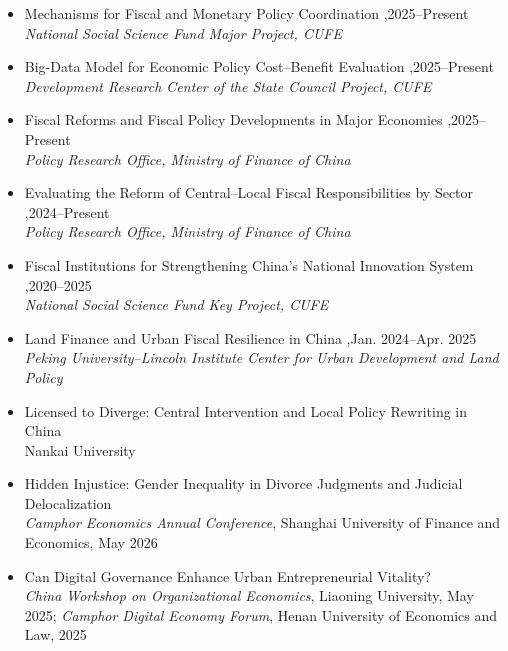 \documentclass[a4paper,10pt]{article}
\begin{document}
\begin{itemize}[itemsep=0.35em, topsep=0.5em]

\item Mechanisms for Fiscal and Monetary Policy Coordination \sep 2025--Present\\
  {\color{gray}\textit{National Social Science Fund Major Project, CUFE}}

\item Big-Data Model for Economic Policy Cost--Benefit Evaluation \sep 2025--Present\\
  {\color{gray}\textit{Development Research Center of the State Council Project, CUFE}}

\item Fiscal Reforms and Fiscal Policy Developments in Major Economies \sep 2025--Present\\
  {\color{gray}\textit{Policy Research Office, Ministry of Finance of China}}

\item Evaluating the Reform of Central--Local Fiscal Responsibilities by Sector \sep 2024--Present\\
  {\color{gray}\textit{Policy Research Office, Ministry of Finance of China}}

\item Fiscal Institutions for Strengthening China's National Innovation System \sep 2020--2025\\
  {\color{gray}\textit{National Social Science Fund Key Project, CUFE}}

\item Land Finance and Urban Fiscal Resilience in China \sep Jan. 2024--Apr. 2025\\
  {\color{gray}\textit{Peking University--Lincoln Institute Center for Urban Development and Land Policy}}

\end{itemize}


\begin{itemize}[itemsep=0.35em, topsep=0.5em]

\item Licensed to Diverge: Central Intervention and Local Policy Rewriting in China\\
  Nankai University

\item Hidden Injustice: Gender Inequality in Divorce Judgments and Judicial Delocalization\\
  \textit{Camphor Economics Annual Conference}, Shanghai University of Finance and Economics, May 2026

\item Can Digital Governance Enhance Urban Entrepreneurial Vitality?\\
  \textit{China Workshop on Organizational Economics}, Liaoning University, May 2025; \textit{Camphor Digital Economy Forum}, Henan University of Economics and Law, 2025

\end{itemize}
\end{document}
